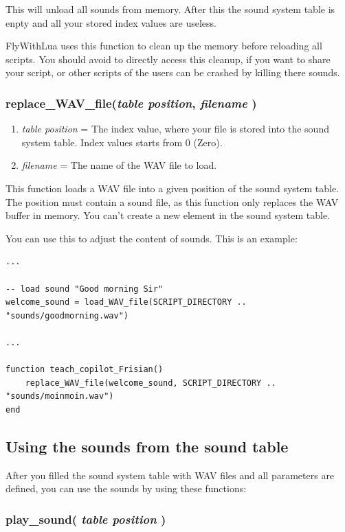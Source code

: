 \documentclass[11pt,parskip=half,a4paper]{scrartcl}
\begin{document}
This will unload all sounds from memory. After this the sound system table is enpty and all your stored index values are useless.

FlyWithLua uses this function to clean up the memory before reloading all scripts. You should avoid to directly access this cleanup, if you want to share your script, or other scripts of the users can be crashed by killing there sounds.

\subsubsection{ replace\_WAV\_file(\emph{table position}, \emph{filename} )}

\begin{enumerate}
	\item \emph{table position} = The index value, where your file is stored into the sound system table. Index values starts from 0 (Zero).
	\item \emph{filename} = The name of the WAV file to load.
\end{enumerate}

This function loads a WAV file into a given position of the sound system table. The position must contain a sound file, as this function only replaces the WAV buffer in memory. You can't create a new element in the sound system table.

You can use this to adjust the content of sounds. This is an example:

\begin{lstlisting}
...

-- load sound "Good morning Sir"
welcome_sound = load_WAV_file(SCRIPT_DIRECTORY .. "sounds/goodmorning.wav")

...

function teach_copilot_Frisian()
    replace_WAV_file(welcome_sound, SCRIPT_DIRECTORY .. "sounds/moinmoin.wav")
end
\end{lstlisting}


\newpage
\subsection{Using the sounds from the sound table}

After you filled the sound system table with WAV files and all parameters are defined, you can use the sounds by using these functions:

\subsubsection{ play\_sound( \emph{table position} )}
\end{document}
